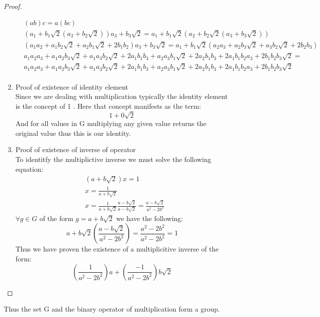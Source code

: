\documentclass[11pt]{article}
\theoremstyle{definition}  %
\begin{document}
\begin{enumerate}
\begin{itemize}
\begin{proof}
\begin{enumerate}
\[       \]
        \begin{align*}
          &(ab)c=a(bc)\\
          &(a_1+b_1\sqrt{2}(a_2+b_2\sqrt{2}))a_3+b_3\sqrt{2}=a_1+b_1\sqrt{2}(a_2+b_2\sqrt{2}(a_3+b_3\sqrt{2}))\\
          &(a_1a_2+a_1b_2\sqrt{2}+a_2b_1\sqrt{2}+2b_1b_2)a_3+b_3\sqrt{2}=a_1+b_1\sqrt{2}(a_2a_3+a_2b_3\sqrt{2}+a_3b_2\sqrt{2}+2b_2b_3)\\
          &a_1a_2a_3+a_1a_2b_3\sqrt{2}
          +a_1a_3b_2\sqrt{2}+2a_1b_1b_3+
          a_2a_3b_1\sqrt{2}+2a_2b_1b_3+
          2a_1b_1b_2a_3+2b_1b_2b_3\sqrt{2}=\\
          &a_1a_2a_3+a_1a_2b_3\sqrt{2}
          +a_1a_3b_2\sqrt{2}+2a_1b_1b_3+
          a_2a_3b_1\sqrt{2}+2a_2b_1b_3+
          2a_1b_1b_2a_3+2b_1b_2b_3\sqrt{2}\\
        \end{align*}
       \item Proof of existence of identity element\\
       Since we are dealing with multiplication typically the identity element is the concept of 1 . Here that concept manifests as the term:
       \[
         1+0\sqrt{2}
       \]
       And for all values in G multiplying any given value returns the original value thus this is our identity.
       \item  Proof of existence of inverse of operator\\
       To identitfy the multiplictive inverse we must solve the following equation:
       \begin{align*}
         &(a+b\sqrt{2})x=1\\
         &x=\frac{1}{a+b\sqrt{2}}\\
         &x=\frac{1}{a+b\sqrt{2}}\frac{a-b\sqrt{2}}{a-b\sqrt{2}}=\frac{a-b\sqrt{2}}{a^2-2b^2}
       \end{align*}
       $\forall g \in G$ of the form $g=a+b\sqrt{2}$ we have the following:
       \[
         a+b\sqrt{2}\left(\frac{a-b\sqrt{2}}{a^2-2b^2}\right)=\frac{a^2-2b^2}{a^2-2b^2}=1
       \]
       Thus we have proven the existence of a multiplicitive inverse of the form:
       \[
        \left( \frac{1}{a^2-2b^2}\right)a+\left(\frac{-1}{a^2-2b^2}\right)b\sqrt{2}
       \]
     \end{enumerate}
   \end{proof}
   Thus the set G and the binary operator of multiplication form a group.
  \end{itemize}
 \end{enumerate}
\end{document}
